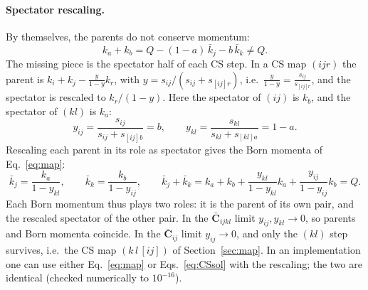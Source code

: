 \documentclass[11pt,a4paper]{article}
\newcommand{\bbC}[1]{\bar{\mathbf C}_{#1}}
\newcommand{\jb}{\bar k_{j}}
\newcommand{\kb}{\bar k_{k}}
\begin{document}
\paragraph{Spectator rescaling.} By themselves, the parents do not conserve momentum:
\begin{equation}
k_a+k_b=Q-(1-a)\,\jb-b\,\kb\neq Q .
\end{equation}
The missing piece is the spectator half of each CS step. In a CS map $(ijr)$ the parent is $k_i+k_j-\frac{y}{1-y}k_r$, with
$y=s_{ij}/(s_{ij}+s_{[ij]r})$, i.e.\ $\frac{y}{1-y}=\frac{s_{ij}}{s_{[ij]r}}$, and the spectator is rescaled to $k_r/(1-y)$.
Here the spectator of $(ij)$ is $k_b$, and the spectator of $(kl)$ is $k_a$:
\begin{equation}
y_{ij}=\frac{s_{ij}}{s_{ij}+s_{[ij]b}}=b,\qquad
y_{kl}=\frac{s_{kl}}{s_{kl}+s_{[kl]a}}=1-a .
\end{equation}
Rescaling each parent in its role as spectator gives the Born momenta of Eq.~\eqref{eq:map}:
\begin{equation}
\boxed{\;\jb=\frac{k_a}{1-y_{kl}},\qquad \kb=\frac{k_b}{1-y_{ij}},\qquad
\jb+\kb=k_a+k_b+\frac{y_{kl}}{1-y_{kl}}k_a+\frac{y_{ij}}{1-y_{ij}}k_b=Q .\;}
\end{equation}
Each Born momentum thus plays two roles: it is the parent of its own pair, and the rescaled spectator of the other pair.
In the $\bbC{ijkl}$ limit $y_{ij},y_{kl}\to0$, so parents and Born momenta coincide. In the $\bbC{ij}$ limit $y_{ij}\to0$, and only the
$(kl)$ step survives, i.e.\ the CS map $(k\,l\,[ij])$ of Section~\ref{sec:map}. In an implementation one can use
either Eq.~\eqref{eq:map} or Eqs.~\eqref{eq:CSsol} with the rescaling; the two are identical (checked numerically to $10^{-16}$).
\end{document}
